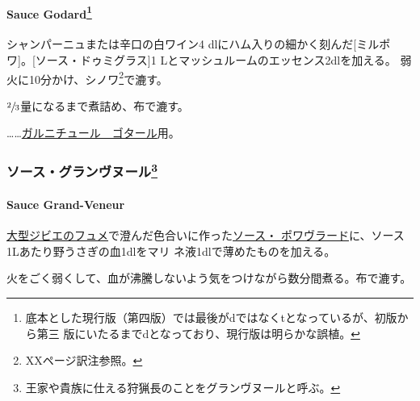 \hypertarget{sauce-godard}{%
\paragraph[Sauce Godard]{\texorpdfstring{Sauce Godard\footnote{底本とした現行版（第四版）では最後がdではなくtとなっているが、初版から第三
  版にいたるまでdとなっており、現行版は明らかな誤植。}}{Sauce Godard}}\label{sauce-godard}}


シャンパーニュまたは辛口の白ワイン4 dlにハム入りの細かく刻んだ{[}ミルポ
ワ{]}。{[}ソース・ドゥミグラス{]}1
Lとマッシュルームのエッセンス2dlを加える。
弱火に10分かけ、シノワ\footnote{XXページ訳注参照。}で漉す。

\(\sfrac{2}{3}\)量になるまで煮詰め、布で漉す。

\ldots{}\ldots{}\href{}{ガルニチュール　ゴタール}用。

\maeaki

\hypertarget{ux30bdux30fcux30b9ux30b0ux30e9ux30f3ux30f4ux30ccux30fcux30eb40}{%
\subsubsection[ソース・グランヴヌール]{\texorpdfstring{ソース・グランヴヌール\footnote{王家や貴族に仕える狩猟長のことをグランヴヌールと呼ぶ。}}{ソース・グランヴヌール}}\label{ux30bdux30fcux30b9ux30b0ux30e9ux30f3ux30f4ux30ccux30fcux30eb40}}

\hypertarget{sauce-grand-veneur}{%
\paragraph{Sauce Grand-Veneur}\label{sauce-grand-veneur}}


\protect\hyperlink{fonds-de-gibier}{大型ジビエのフュメ}で澄んだ色合いに作った\protect\hyperlink{sauce-poivrade}{ソース・
ポワヴラード}に、ソース1Lあたり野うさぎの血1dlをマリ
ネ液1dlで薄めたものを加える。

火をごく弱くして、血が沸騰しないよう気をつけながら数分間煮る。布で漉す。

\maeaki

